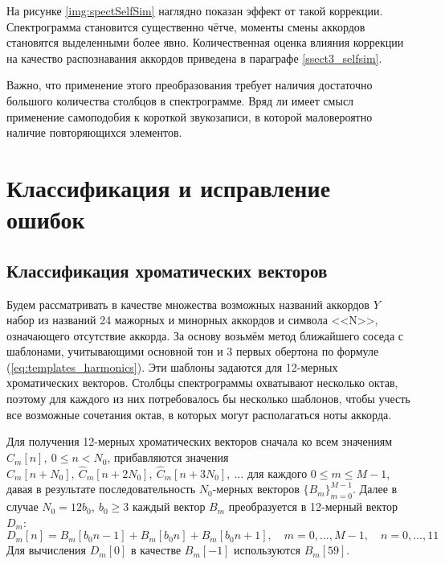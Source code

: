 На рисунке \ref{img:spectSelfSim} наглядно показан эффект от такой коррекции.
Спектрограмма становится существенно чётче, моменты смены аккордов становятся
выделенными более явно. Количественная оценка влияния коррекции на качество
распознавания аккордов приведена в параграфе \ref{ssect3_selfsim}.

Важно, что применение этого преобразования требует наличия достаточно большого
количества столбцов в спектрограмме. Вряд ли имеет смысл применение самоподобия
к короткой звукозаписи, в которой маловероятно наличие повторяющихся элементов. 



\section{Классификация и исправление ошибок} \label{sect1_class}

\subsection{Классификация хроматических векторов} \label{ssect1_chroma}

Будем рассматривать в качестве множества возможных названий аккордов $Y$ набор
из названий 24 мажорных и минорных аккордов и символа <<N>>, означающего
отсутствие аккорда. За основу возьмём метод ближайшего соседа с шаблонами,
учитывающими основной тон и 3 первых обертона по формуле
(\ref{eq:templates_harmonics}). Эти шаблоны задаются для 12-мерных хроматических
векторов. Столбцы спектрограммы охватывают несколько октав, поэтому для каждого
из них потребовалось бы несколько шаблонов, чтобы учесть все возможные
сочетания октав, в которых могут располагаться ноты аккорда.


Для получения 12-мерных хроматических векторов сначала ко всем значениям
$\widehat{C}_m[n], ~ 0 \leq n < N_0$, прибавляются значения
$\widehat{C}_m[n+N_0], ~ \widehat{C}_m[n+2N_0], ~ \widehat{C}_m[n+3N_0], ~
\ldots$ для каждого $0 \leq m \leq M-1$, давая в результате последовательность
$N_0$-мерных векторов $\{B_m\}_{m=0}^{M-1}$. Далее в случае $N_0=12 b_0, ~ b_0
\geq 3$ каждый вектор $B_m$ преобразуется в 12-мерный вектор $D_m$:
$$ D_m[n] = B_m[b_0 n - 1] + B_m[b_0 n] + B_m[b_0 n + 1], \quad m=0,\dots,M-1,
\quad n=0,\dots,11 $$ 
Для вычисления $D_m[0]$ в качестве $B_m[-1]$ используются $B_m[59]$.

